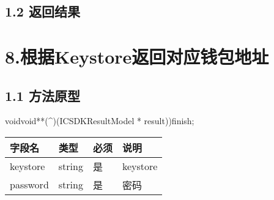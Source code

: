\documentclass[letterpaper,10pt,english]{sphinxmanual}
\begin{document}
\subsection{1.2 返回结果}
\label{\detokenize{BCBWalletSDK_u63a5_u53e3_u8bf4_u660e:id116}}

\begin{sphinxVerbatim}[commandchars=\\\{\}]
     
     
\end{sphinxVerbatim}


\begin{sphinxVerbatim}[commandchars=\\\{\}]
     
\end{sphinxVerbatim}


\section{8.根据Keystore返回对应钱包地址}
\label{\detokenize{BCBWalletSDK_u63a5_u53e3_u8bf4_u660e:id117}}

\subsection{1.1 方法原型}
\label{\detokenize{BCBWalletSDK_u63a5_u53e3_u8bf4_u660e:id118}}
\sphinxstylestrong{-(}voidvoid**(\textasciicircum{})(ICSDKResultModel
* result))finish;



\begin{savenotes}\sphinxattablestart
\centering
\begin{tabulary}{\linewidth}[t]{|T|T|T|T|}
\hline
\sphinxstyletheadfamily 
字段名
&\sphinxstyletheadfamily 
类型
&\sphinxstyletheadfamily 
必须
&\sphinxstyletheadfamily 
说明
\\
\hline
keystore
&
string
&
是
&
keystore
\\
\hline
password
&
string
&
是
&
密码
\\
\hline
\end{tabulary}
\par
\sphinxattableend\end{savenotes}
\end{document}
